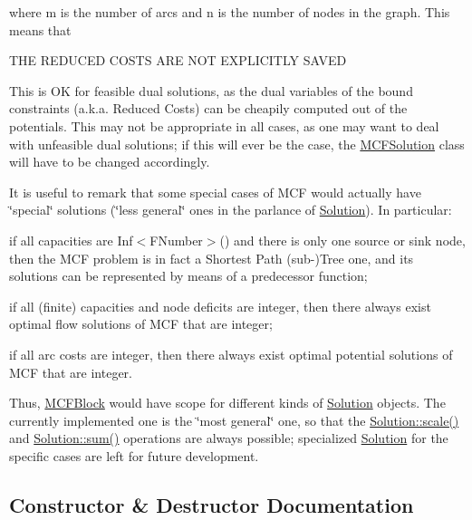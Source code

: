 where m is the number of arcs and n is the number of nodes in the graph. This means that \begin{DoxyVerb}  THE REDUCED COSTS ARE NOT EXPLICITLY SAVED
\end{DoxyVerb}


This is OK for feasible dual solutions, as the dual variables of the bound constraints (a.\+k.\+a. Reduced Costs) can be cheapily computed out of the potentials. This may not be appropriate in all cases, as one may want to deal with unfeasible dual solutions; if this will ever be the case, the \mbox{\hyperlink{class_s_m_spp__di__unipi__it_1_1_m_c_f_solution}{M\+C\+F\+Solution}} class will have to be changed accordingly.

It is useful to remark that some special cases of M\+CF would actually have \char`\"{}special\char`\"{} solutions (\char`\"{}less general\char`\"{} ones in the parlance of \mbox{\hyperlink{class_s_m_spp__di__unipi__it_1_1_solution}{Solution}}). In particular\+:


\begin{DoxyItemize}
\item if all capacities are Inf$<$\+F\+Number$>$() and there is only one source or sink node, then the M\+CF problem is in fact a Shortest Path (sub-\/)Tree one, and its solutions can be represented by means of a predecessor function;
\item if all (finite) capacities and node deficits are integer, then there always exist optimal flow solutions of M\+CF that are integer;
\item if all arc costs are integer, then there always exist optimal potential solutions of M\+CF that are integer.
\end{DoxyItemize}

Thus, \mbox{\hyperlink{class_s_m_spp__di__unipi__it_1_1_m_c_f_block}{M\+C\+F\+Block}} would have scope for different kinds of \mbox{\hyperlink{class_s_m_spp__di__unipi__it_1_1_solution}{Solution}} objects. The currently implemented one is the \char`\"{}most general\char`\"{} one, so that the \mbox{\hyperlink{class_s_m_spp__di__unipi__it_1_1_solution_abf1a2d1763f128a72b2677d4b9ff4d3b}{Solution\+::scale()}} and \mbox{\hyperlink{class_s_m_spp__di__unipi__it_1_1_solution_adc2450947fd142657637bf79d91505a9}{Solution\+::sum()}} operations are always possible; specialized \mbox{\hyperlink{class_s_m_spp__di__unipi__it_1_1_solution}{Solution}} for the specific cases are left for future development. 

\subsection{Constructor \& Destructor Documentation}
\mbox{\label{class_s_m_spp__di__unipi__it_1_1_m_c_f_solution_a06cb8183f6fd315bada6c44615d2d72f}} 
